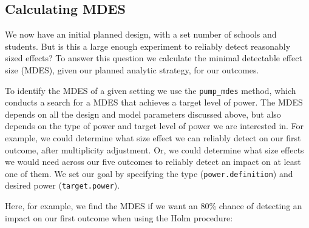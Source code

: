 \documentclass[
]{article}
\begin{document}
\subsection{Calculating MDES}

We now have an initial planned design, with a set number of schools and
students. But is this a large enough experiment to reliably detect
reasonably sized effects? To answer this question we calculate the
minimal detectable effect size (MDES), given our planned analytic
strategy, for our outcomes.

To identify the MDES of a given setting we use the \texttt{pump\_mdes}
method, which conducts a search for a MDES that achieves a target level
of power. The MDES depends on all the design and model parameters
discussed above, but also depends on the type of power and target level
of power we are interested in. For example, we could determine what size
effect we can reliably detect on our first outcome, after multiplicity
adjustment. Or, we could determine what size effects we would need
across our five outcomes to reliably detect an impact on at least one of
them. We set our goal by specifying the type (\texttt{power.definition})
and desired power (\texttt{target.power}).

Here, for example, we find the MDES if we want an 80\% chance of
detecting an impact on our first outcome when using the Holm procedure:
\end{document}
